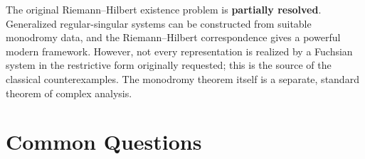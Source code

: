 \begin{partiallybox}
The original Riemann--Hilbert existence problem is \textbf{partially resolved}. Generalized regular-singular systems can be constructed from suitable monodromy data, and the Riemann--Hilbert correspondence gives a powerful modern framework. However, not every representation is realized by a Fuchsian system in the restrictive form originally requested; this is the source of the classical counterexamples. The monodromy theorem itself is a separate, standard theorem of complex analysis.
\end{partiallybox}

\section*{Common Questions}


